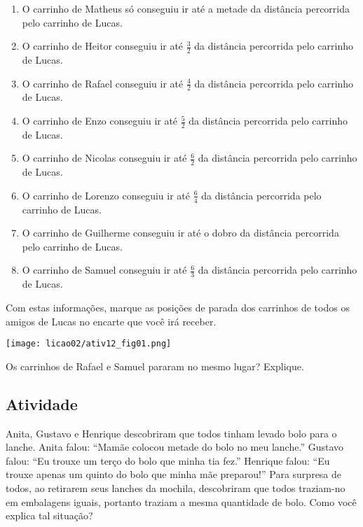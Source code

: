 \begin{enumerate} [\quad a)] %
  \item     O carrinho de Matheus só conseguiu ir até a metade da distância percorrida pelo carrinho de Lucas.
  \item     O carrinho de Heitor conseguiu ir até     $\frac{3}{2}$     da distância percorrida pelo carrinho de Lucas.
  \item     O carrinho de Rafael conseguiu ir até     $\frac{4}{2}$     da distância percorrida pelo carrinho de Lucas.
  \item     O carrinho de Enzo conseguiu ir até     $\frac{5}{2}$     da distância percorrida pelo carrinho de Lucas.
  \item     O carrinho de Nicolas conseguiu ir até     $\frac{6}{2}$     da distância percorrida pelo carrinho de Lucas.
  \item     O carrinho de Lorenzo conseguiu ir até     $\frac{6}{4}$     da distância percorrida pelo carrinho de Lucas.
  \item     O carrinho de Guilherme conseguiu ir até o dobro da distância percorrida pelo carrinho de Lucas.
  \item     O carrinho de Samuel conseguiu ir até     $\frac{6}{3}$     da distância percorrida pelo carrinho de Lucas.
\end{enumerate} %


Com estas informações, marque as posições de parada dos carrinhos de todos os amigos de Lucas no encarte que você irá receber.

\begin{center}
\texttt{[image: licao02/ativ12\_fig01.png]}
\end{center}


Os carrinhos de Rafael e Samuel pararam no mesmo lugar? Explique.


\subsection{Atividade}

Anita, Gustavo e Henrique descobriram que todos tinham levado bolo para o lanche.\newline
Anita falou: ``Mamãe colocou metade do bolo no meu lanche.''\newline
Gustavo falou: ``Eu trouxe um terço do bolo que minha tia fez.''\newline
Henrique falou: ``Eu trouxe apenas um quinto do bolo que minha mãe preparou!''\newline
Para surpresa de todos, ao retirarem seus lanches da mochila, descobriram que todos traziam-no em  embalagens iguais, portanto traziam a mesma quantidade de bolo.\newline
Como você explica tal situação?


